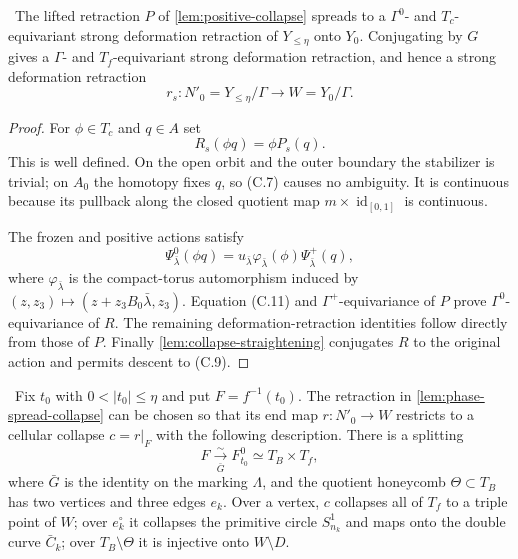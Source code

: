 \begin{lemma}
\label{lem:phase-spread-collapse}
\Verified\ The lifted retraction $P$ of \cref{lem:positive-collapse} spreads
to a $\Gamma^0$- and $T_c$-equivariant strong deformation retraction of
$Y_{\leq\eta}$ onto $Y_0$.  Conjugating by $G$ gives a $\Gamma$- and
$T_f$-equivariant strong deformation retraction, and hence a strong
deformation retraction
\[
 r_s:N'_0=Y_{\leq\eta}/\Gamma\longrightarrow W=Y_0/\Gamma.
\tag{C.9}
\]
\end{lemma}

\begin{proof}
For $\phi\in T_c$ and $q\in A$ set
\[
 R_s(\phi q)=\phi P_s(q).
\tag{C.10}
\]
This is well defined.  On the open orbit and the outer boundary the
stabilizer is trivial; on $A_0$ the homotopy fixes $q$, so (C.7) causes no
ambiguity.  It is continuous because its pullback along the closed quotient
map $m\times\operatorname{id}_{[0,1]}$ is continuous.

The frozen and positive actions satisfy
\[
 \Psi^0_{\bar\lambda}(\phi q)=
 u_{\bar\lambda}\varphi_{\bar\lambda}(\phi)
 \Psi^+_{\bar\lambda}(q),
\tag{C.11}
\]
where $\varphi_{\bar\lambda}$ is the compact-torus automorphism induced by
$(z,z_3)\mapsto(z+z_3B_0\bar\lambda,z_3)$.  Equation (C.11) and
$\Gamma^+$-equivariance of $P$ prove $\Gamma^0$-equivariance of $R$.
The remaining deformation-retraction identities follow directly from those
of $P$.  Finally \cref{lem:collapse-straightening} conjugates $R$ to the
original action and permits descent to (C.9).
\end{proof}

\begin{proposition}
\label{prop:verified-cellular-collapse}
\Verified\ Fix $t_0$ with $0<|t_0|\leq\eta$ and put $F=f^{-1}(t_0)$.  The
retraction in \cref{lem:phase-spread-collapse} can be chosen so that its end
map $r:N'_0\to W$ restricts to a cellular collapse $c=r|_F$ with the following
description.  There is a splitting
\[
 F\xrightarrow[\bar G]{\sim}F_{t_0}^0\simeq T_B\times T_f,
\tag{C.12}
\]
where $\bar G$ is the identity on the marking $\Lambda$, and the quotient
honeycomb $\Theta\subset T_B$ has two vertices and three edges $e_k$.  Over a
vertex, $c$ collapses all of $T_f$ to a triple point of $W$; over
$e_k^\circ$ it collapses the primitive circle $S^1_{n_k}$ and maps onto the
double curve $\bar C_k$; over $T_B\setminus\Theta$ it is injective onto
$W\setminus D$.
\end{proposition}

